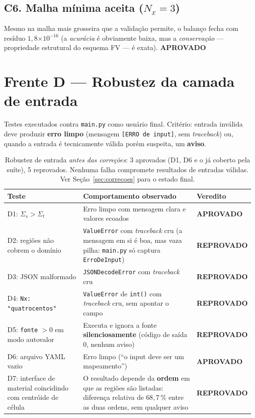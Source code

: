\documentclass[11pt,a4paper]{article}
\newcommand{\aprovado}{\textcolor{green!45!black}{\textbf{APROVADO}}}
\newcommand{\reprovado}{\textcolor{red!70!black}{\textbf{REPROVADO}}}
\newcommand{\e}[1]{\ensuremath{\times 10^{#1}}}
\begin{document}
\subsection{C6. Malha mínima aceita ($N_x = 3$)}
Mesmo na malha mais grosseira que a validação permite, o balanço fecha com
resíduo $1{,}8\e{-16}$ (a \emph{acurácia} é obviamente baixa, mas a
\emph{conservação} --- propriedade estrutural do esquema FV --- é exata).
\hfill \aprovado

\section{Frente D --- Robustez da camada de entrada}

Testes executados contra \texttt{main.py} como usuário final. Critério:
entrada inválida deve produzir \textbf{erro limpo} (mensagem
\texttt{[ERRO de input]}, sem \emph{traceback}) ou, quando a entrada é
tecnicamente válida porém suspeita, um \textbf{aviso}.

\begin{table}[h!]\centering\small
\begin{tabular}{p{4.6cm}p{5.6cm}l}
\toprule
Teste & Comportamento observado & Veredito \\
\midrule
D1: $\Sigma_s > \Sigma_t$ & Erro limpo com mensagem clara e valores ecoados & \aprovado \\
\addlinespace
D2: regiões não cobrem o domínio & \texttt{ValueError} com \emph{traceback} cru (a mensagem em si é boa, mas vaza pilha: \texttt{main.py} só captura \texttt{ErroDeInput}) & \reprovado \\
\addlinespace
D3: JSON malformado & \texttt{JSONDecodeError} com \emph{traceback} cru & \reprovado \\
\addlinespace
D4: \texttt{Nx: "quatrocentos"} & \texttt{ValueError} de \texttt{int()} com \emph{traceback} cru, sem apontar o campo & \reprovado \\
\addlinespace
D5: \texttt{fonte} $>0$ em modo autovalor & Executa e ignora a fonte \textbf{silenciosamente} (código de saída 0, nenhum aviso) & \reprovado \\
\addlinespace
D6: arquivo YAML vazio & Erro limpo (``o input deve ser um mapeamento'') & \aprovado \\
\addlinespace
D7: interface de material coincidindo com centróide de célula & O resultado depende da \textbf{ordem} em que as regiões são listadas: diferença relativa de $68{,}7\,\%$ entre as duas ordens, sem qualquer aviso & \reprovado \\
\bottomrule
\end{tabular}
\caption{Robustez de entrada \emph{antes das correções}: 3 aprovados (D1, D6 e
o já coberto pela suíte), 5 reprovados. Nenhuma falha compromete resultados de
entradas válidas. Ver Seção~\ref{sec:correcoes} para o estado final.}
\end{table}
\end{document}
